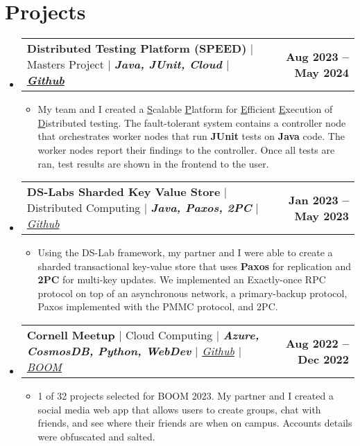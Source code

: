 \documentclass[letterpaper,11pt]{article}
\makeatletter
\newcommand{\resumeItem}[1]{
  \item\small{
    {#1 \vspace{-2pt}}
  }
}
\newcommand{\resumeProjectHeading}[2]{
    \item
    \begin{tabular*}{1.001\textwidth}{l@{\extracolsep{\fill}}r}
      \small#1 & \textbf{\small #2}\\
    \end{tabular*}\vspace{-7pt}
}
\newcommand{\resumeSubHeadingListStart}{\begin{itemize}[leftmargin=0.0in, label={}]}
\newcommand{\resumeSubHeadingListEnd}{\end{itemize}}
\newcommand{\resumeItemListStart}{\begin{itemize}}
\newcommand{\resumeItemListEnd}{\end{itemize}\vspace{-5pt}}
\makeatother
\begin{document}
\section{Projects}
    \vspace{-6pt}
    \resumeSubHeadingListStart
    \resumeProjectHeading
          {\textbf{Distributed Testing Platform (SPEED)} $|$ Masters Project $|$ \textbf{\emph{Java, JUnit, Cloud}\emph{ $|$
          \href{https://github.com/MitchellGray100/SPEED}{Github}}}}{Aug 2023 -- May 2024}
          \resumeItemListStart
            \resumeItem{ My team and I created a \underline{S}calable \underline{P}latform for \underline{E}fficient \underline{E}xecution of
            \underline{D}istributed testing. The fault-tolerant system contains a controller node that orchestrates worker nodes that 
            run \textbf{JUnit} tests on \textbf{Java} code. The worker nodes report their findings to the controller. Once all tests are ran, test results are
            shown in the frontend to the user.
            }
          \resumeItemListEnd
          \vspace{-14pt}
    \resumeProjectHeading
          {\textbf{DS-Labs Sharded Key Value Store} $|$ Distributed Computing $|$ \textbf{\emph{Java, Paxos, 2PC}}\emph{ $|$
          \href{https://github.com/emichael/dslabs}{Github}}}{Jan 2023 -- May 2023}
          \resumeItemListStart
            \resumeItem{ Using the DS-Lab framework, my partner and I were able to create a sharded transactional key-value 
            store that uses \textbf{Paxos} for replication and \textbf{2PC} for multi-key updates. We implemented
            an Exactly-once RPC protocol on top of an asynchronous network, a primary-backup protocol, 
            Paxos implemented with the PMMC protocol, and 2PC.}
          \resumeItemListEnd
          \vspace{-14pt}
    \resumeProjectHeading
          {\textbf{Cornell Meetup} $|$ Cloud Computing $|$ \textbf{\emph{Azure, CosmosDB, Python, WebDev}}\emph{ $|$
          \href{https://github.com/MitchellGray100/CornellMeetUp}{Github}
          $|$ \href{https://cis.cornell.edu/about/outreach-events/boom-bits-our-minds/projects/boom-2023-projects}
          {BOOM}}}{Aug 2022 -- Dec 2022}
          \resumeItemListStart
            \resumeItem{ 1 of 32 projects selected for BOOM 2023. My partner and I created a 
            social media web app that allows users to create groups, chat with friends,
            and see where their friends are when on campus. Accounts details were obfuscated and salted.}
          \resumeItemListEnd
          \vspace{-14pt}
    \resumeSubHeadingListEnd
\vspace{-3pt}
\end{document}
